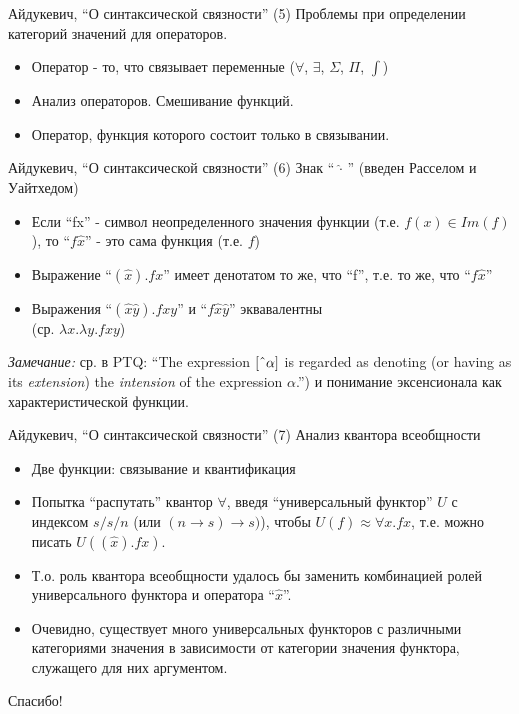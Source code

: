 \documentclass{beamer}
\begin{document}
\begin{frame}{Айдукевич, ``О синтаксической связности'' (5)}
Проблемы при определении категорий значений для операторов.\\
\bigskip
\begin{itemize}
  \item Оператор - то, что связывает переменные ($\forall$, $\exists$, $\Sigma$, $\Pi$, $\int$)
  \item Анализ операторов. Смешивание функций. 
  \item Оператор, функция которого состоит только в связывании.
\end{itemize}
\end{frame}

\begin{frame}{Айдукевич, ``О синтаксической связности'' (6)}
Знак ``$\,\hat{\cdot}\,$'' (введен Расселом и Уайтхедом)\\
\bigskip
\begin{itemize}
  \item Если ``fx'' - символ неопределенного значения функции (т.е. $f(x) \in Im(f)$), то ``$f\hat{x}$'' - это сама функция (т.е. $f$) 
  \item Выражение ``$(\hat{x}).fx$'' имеет денотатом то же, что ``f'', т.е. то же, что ``$f\hat{x}$''
  \item Выражения ``$(\hat{x}\hat{y}).fxy$'' и ``$f\hat{x}\hat{y}$'' эквавалентны \\(ср. $\lambda x.\lambda y.fxy$)
\end{itemize}
\bigskip
\textit{Замечание:} ср. в PTQ: ``The expression $[\string^\alpha]$ is regarded as denoting (or having as its \textit{extension}) the \textit{intension} of the expression $\alpha$.'') и понимание эксенсионала как характеристической функции.
\end{frame}

\begin{frame}{Айдукевич, ``О синтаксической связности'' (7)}
Анализ квантора всеобщности\\
\bigskip
\begin{itemize}
  \item Две функции: связывание и квантификация
  \item Попытка ``распутать'' квантор $\forall$, введя ``универсальный функтор'' $U$ с индексом $s/s/n$ (или $(n \to s) \to s)$), чтобы $U(f) \approx \forall x.fx$, т.е. можно писать $U((\hat{x}).fx)$.
  \item Т.о. роль квантора всеобщности удалось бы заменить комбинацией ролей универсального функтора и оператора ``$\hat{x}$''.
  \item Очевидно, существует много универсальных функторов с различными категориями значения в зависимости от категории значения функтора, служащего для них аргументом.
\end{itemize}
\end{frame}


\begin{frame}{}
    \thispagestyle{empty}
    \begin{center}
        {\large Спасибо!}
    \end{center}
\end{frame}


\end{document}
